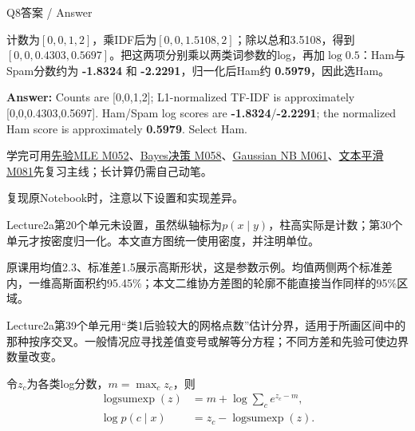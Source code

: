 \begin{StudySolution}{Q8答案 / Answer}


计数为\([0,0,1,2]\)，乘IDF后为\([0,0,1.5108,2]\)；除以总和3.5108，得到\([0,0,0.4303,0.5697]\)。把这两项分别乘以两类词参数的log，再加\(\log0.5\)：Ham与Spam分数约为 \textbf{-1.8324} 和 \textbf{-2.2291}，归一化后Ham约 \textbf{0.5979}，因此选Ham。


\textbf{Answer:} Counts are [0,0,1,2]; L1-normalized TF-IDF is approximately [0,0,0.4303,0.5697]. Ham/Spam log scores are \textbf{-1.8324}/\textbf{-2.2291}; the normalized Ham score is approximately \textbf{0.5979}. Select Ham.


\end{StudySolution}


学完可用\href{https://crazyshout.github.io/micro-course/cards.html\#CS5489-M052}{先验MLE M052}、\href{https://crazyshout.github.io/micro-course/cards.html\#CS5489-M058}{Bayes决策 M058}、\href{https://crazyshout.github.io/micro-course/cards.html\#CS5489-M061}{Gaussian NB M061}、\href{https://crazyshout.github.io/micro-course/cards.html\#CS5489-M081}{文本平滑 M081}先复习主线；长计算仍需自己动笔。








复现原Notebook时，注意以下设置和实现差异。





Lecture2a第20个单元未设置，虽然纵轴标为\(p(x\mid y)\)，柱高实际是计数；第30个单元才按密度归一化。本文直方图统一使用密度，并注明单位。


原课用均值2.3、标准差1.5展示高斯形状，这是参数示例。均值两侧两个标准差内，一维高斯面积约95.45\%；本文二维协方差图的轮廓不能直接当作同样的95\%区域。


Lecture2a第39个单元用“类1后验较大的网格点数”估计分界，适用于所画区间中的那种按序交叉。一般情况应寻找差值变号或解等分方程；不同方差和先验可使边界数量改变。





令\(z_c\)为各类log分数，\(m=\max_c z_c\)，则
\[
\begin{aligned}
\operatorname{logsumexp}(z)&=m+\log\sum_c e^{z_c-m},\\
\log p(c\mid x)&=z_c-\operatorname{logsumexp}(z).
\end{aligned}
\tag{2.36}
\]


